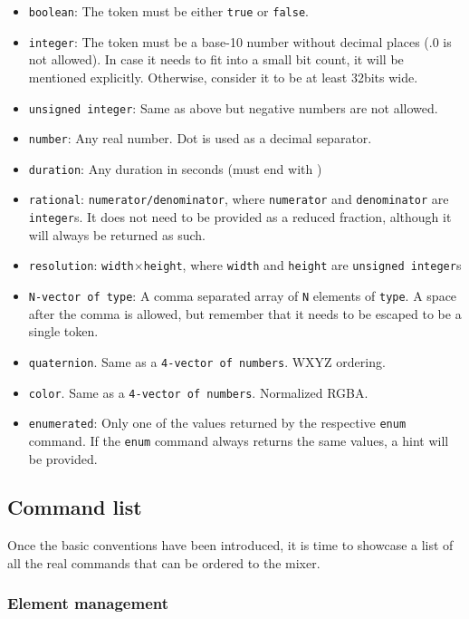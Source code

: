 \documentclass[../main.tex]{subfiles}
\begin{document}
\begin{itemize}
    \item \texttt{boolean}: The token must be either \texttt{true} or \texttt{false}.
    \item \texttt{integer}: The token must be a base-10 number without decimal places (.0 is not allowed). In case it needs to fit into a small bit count, it will be mentioned explicitly. Otherwise, consider it to be at least 32bits wide.
    \item \texttt{unsigned integer}: Same as above but negative numbers are not allowed.
    \item \texttt{number}: Any real number. Dot is used as a decimal separator.
    \item \texttt{duration}: Any duration in seconds (must end with )
    \item \texttt{rational}: \texttt{numerator/denominator}, where \texttt{numerator} and \texttt{denominator} are \texttt{integer}s. It does not need to be provided as a reduced fraction, although it will always be returned as such.
    \item \texttt{resolution}: \texttt{width$\times$height}, where \texttt{width} and \texttt{height} are \texttt{unsigned integer}s
    \item \texttt{N-vector of type}: A comma separated array of \texttt{N} elements of \texttt{type}. A space after the comma is allowed, but remember that it needs to be escaped to be a single token.
    \item \texttt{quaternion}. Same as a \texttt{4-vector of numbers}. WXYZ ordering.
    \item \texttt{color}. Same as a \texttt{4-vector of numbers}. Normalized RGBA.
    \item \texttt{enumerated}: Only one of the values returned by the respective \texttt{enum} command. If the \texttt{enum} command always returns the same values, a hint will be provided.
    
\end{itemize}


\subsection{Command list}

Once the basic conventions have been introduced, it is time to showcase a list of all the real commands that can be ordered to the mixer.\newline

\subsubsection{Element management}
\end{document}
